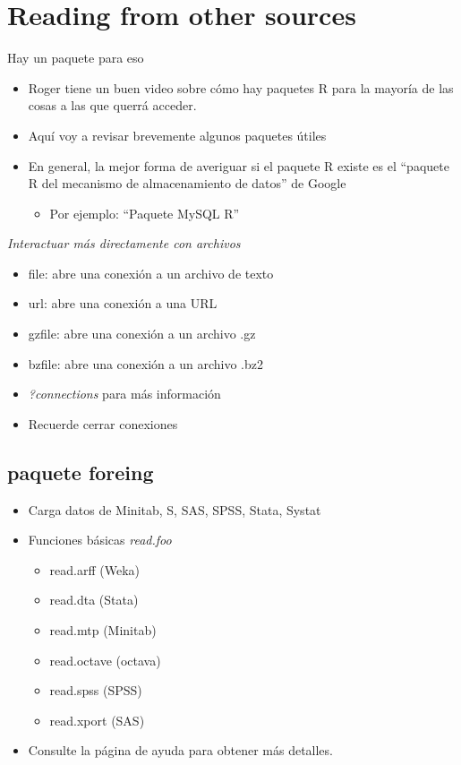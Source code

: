 \documentclass[
]{article}
\providecommand{\tightlist}{%
  \setlength{\itemsep}{0pt}\setlength{\parskip}{0pt}}
\begin{document}
\hypertarget{reading-from-other-sources}{%
\section{Reading from other sources}\label{reading-from-other-sources}}

Hay un paquete para eso

\begin{itemize}
\tightlist
\item
  Roger tiene un buen video sobre cómo hay paquetes R para la mayoría de
  las cosas a las que querrá acceder.
\item
  Aquí voy a revisar brevemente algunos paquetes útiles
\item
  En general, la mejor forma de averiguar si el paquete R existe es el
  ``paquete R del mecanismo de almacenamiento de datos'' de Google

  \begin{itemize}
  \tightlist
  \item
    Por ejemplo: ``Paquete MySQL R''
  \end{itemize}
\end{itemize}

\emph{Interactuar más directamente con archivos}

\begin{itemize}
\tightlist
\item
  file: abre una conexión a un archivo de texto
\item
  url: abre una conexión a una URL
\item
  gzfile: abre una conexión a un archivo .gz
\item
  bzfile: abre una conexión a un archivo .bz2
\item
  \emph{?connections} para más información
\item
  Recuerde cerrar conexiones
\end{itemize}

\hypertarget{paquete-foreing}{%
\subsection{paquete foreing}\label{paquete-foreing}}

\begin{itemize}
\tightlist
\item
  Carga datos de Minitab, S, SAS, SPSS, Stata, Systat
\item
  Funciones básicas \emph{read.foo}

  \begin{itemize}
  \tightlist
  \item
    read.arff (Weka)
  \item
    read.dta (Stata)
  \item
    read.mtp (Minitab)
  \item
    read.octave (octava)
  \item
    read.spss (SPSS)
  \item
    read.xport (SAS)
  \end{itemize}
\item
  Consulte la página de ayuda para obtener más detalles.
\end{itemize}
\end{document}
